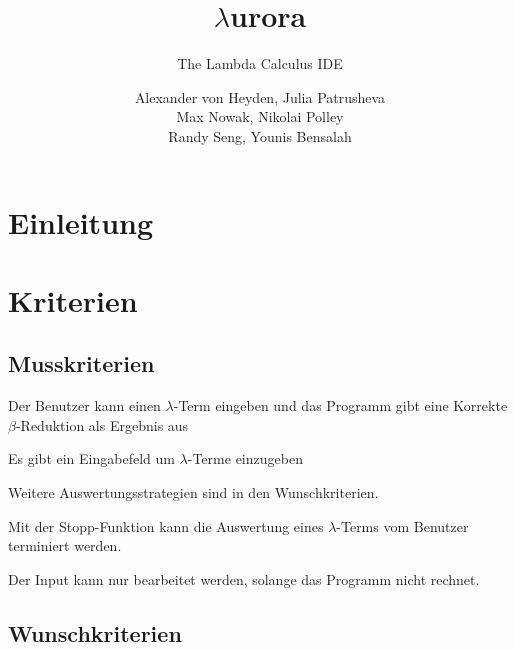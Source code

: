 \documentclass[parskip=full,11pt,twoside]{scrartcl}
\title{$\lambda$urora}
\subtitle{The Lambda Calculus IDE}
\author{Alexander von Heyden, Julia Patrusheva\\
 Max Nowak, Nikolai Polley\\
 Randy Seng, Younis Bensalah}
\begin{document}
\maketitle
\newpage
\tableofcontents

\newpage
\section{Einleitung}


\pagebreak
\section{Kriterien}

\subsection{Musskriterien}


Der Benutzer kann einen $\lambda$-Term eingeben und das Programm gibt eine Korrekte $\beta$-Reduktion als Ergebnis aus 

Es gibt ein Eingabefeld um $\lambda$-Terme einzugeben

 Weitere Auswertungsstrategien sind in den Wunschkriterien.


Mit der Stopp-Funktion kann die Auswertung eines $\lambda$-Terms vom Benutzer terminiert werden.


Der Input kann nur bearbeitet werden, solange das Programm nicht rechnet.


\subsection{Wunschkriterien}

\end{document}
